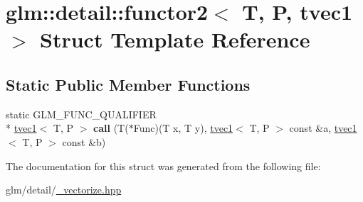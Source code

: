 \hypertarget{structglm_1_1detail_1_1functor2_3_01T_00_01P_00_01tvec1_01_4}{\section{glm\-:\-:detail\-:\-:functor2$<$ T, P, tvec1 $>$ Struct Template Reference}
\label{structglm_1_1detail_1_1functor2_3_01T_00_01P_00_01tvec1_01_4}
}
\subsection*{Static Public Member Functions}
\begin{DoxyCompactItemize}
\item 
\hypertarget{structglm_1_1detail_1_1functor2_3_01T_00_01P_00_01tvec1_01_4_a7f805874487ee439ec9f5ca600f1813d}{static G\-L\-M\-\_\-\-F\-U\-N\-C\-\_\-\-Q\-U\-A\-L\-I\-F\-I\-E\-R \\*
\hyperlink{structglm_1_1tvec1}{tvec1}$<$ T, P $>$ {\bfseries call} (T($\ast$Func)(T x, T y), \hyperlink{structglm_1_1tvec1}{tvec1}$<$ T, P $>$ const \&a, \hyperlink{structglm_1_1tvec1}{tvec1}$<$ T, P $>$ const \&b)}\label{structglm_1_1detail_1_1functor2_3_01T_00_01P_00_01tvec1_01_4_a7f805874487ee439ec9f5ca600f1813d}

\end{DoxyCompactItemize}


The documentation for this struct was generated from the following file\-:\begin{DoxyCompactItemize}
\item 
glm/detail/\hyperlink{__vectorize_8hpp}{\-\_\-vectorize.\-hpp}\end{DoxyCompactItemize}
